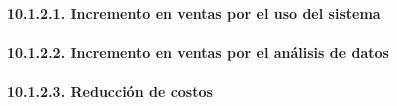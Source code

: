 \paragraph{10.1.2.1. Incremento en ventas por el uso del sistema}\label{sec:cap10_roi_ventas_sistema}


\paragraph{10.1.2.2. Incremento en ventas por el análisis de datos}\label{sec:cap10_roi_ventas_datos}


\paragraph{10.1.2.3. Reducción de costos}\label{sec:cap10_roi_reduccion}


